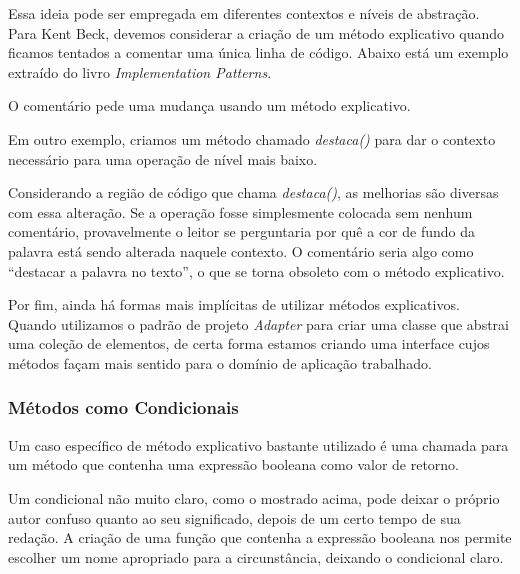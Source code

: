 Essa ideia pode ser empregada em diferentes contextos e níveis de abstração. Para Kent Beck, devemos considerar a criação de um método explicativo quando ficamos tentados a comentar uma única linha de código. Abaixo está um exemplo extraído do livro \textit{Implementation Patterns}.



O comentário pede uma mudança usando um método explicativo.
	


Em outro exemplo, criamos um método chamado \textit{destaca()} para dar o contexto necessário para uma operação de nível mais baixo. 



Considerando a região de código que chama \textit{destaca()}, as melhorias são diversas com essa alteração. Se a operação fosse simplesmente colocada sem nenhum comentário, provavelmente o leitor se perguntaria por quê a cor de fundo da palavra está sendo alterada naquele contexto. O comentário seria algo como “destacar a palavra no texto”, o que se torna obsoleto com o método explicativo. 

Por fim, ainda há formas mais implícitas de utilizar métodos explicativos. Quando utilizamos o padrão de projeto \textit{Adapter} \citep{GOF95} para criar uma classe que abstrai uma coleção de elementos, de certa forma estamos criando uma interface cujos métodos façam mais sentido para o domínio de aplicação trabalhado.

\subsubsection{Métodos como Condicionais}
\label{metodos:condicionais}
Um caso específico de método explicativo bastante utilizado é uma chamada para um método que contenha uma expressão booleana como valor de retorno.
	


Um condicional não muito claro, como o mostrado acima, pode deixar o próprio autor confuso quanto ao seu significado, depois de um certo tempo de sua redação. A criação de uma função que contenha a expressão booleana nos permite escolher um nome apropriado para a circunstância, deixando o condicional claro.

